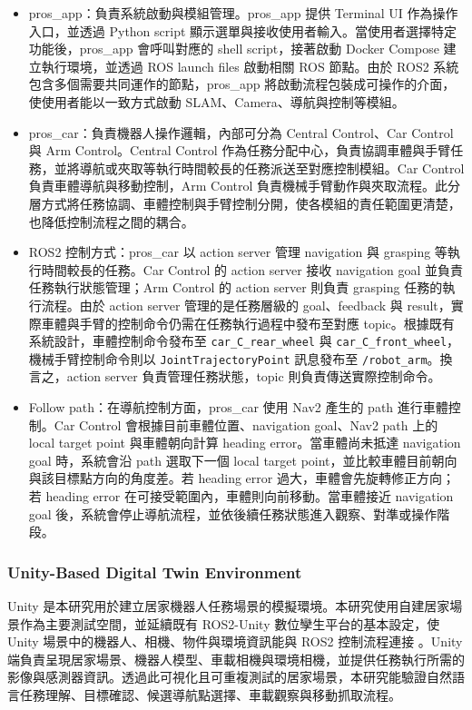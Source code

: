 \documentclass[12pt,a4paper]{article}
\begin{document}
\begin{itemize}
  \item pros\_app：負責系統啟動與模組管理。pros\_app 提供 Terminal UI 作為操作入口，並透過 Python script 顯示選單與接收使用者輸入。當使用者選擇特定功能後，pros\_app 會呼叫對應的 shell script，接著啟動 Docker Compose 建立執行環境，並透過 ROS launch files 啟動相關 ROS 節點。由於 ROS2 系統包含多個需要共同運作的節點，pros\_app 將啟動流程包裝成可操作的介面，使使用者能以一致方式啟動 SLAM、Camera、導航與控制等模組。
  \item pros\_car：負責機器人操作邏輯，內部可分為 Central Control、Car Control 與 Arm Control。Central Control 作為任務分配中心，負責協調車體與手臂任務，並將導航或夾取等執行時間較長的任務派送至對應控制模組。Car Control 負責車體導航與移動控制，Arm Control 負責機械手臂動作與夾取流程。此分層方式將任務協調、車體控制與手臂控制分開，使各模組的責任範圍更清楚，也降低控制流程之間的耦合。
  \item ROS2 控制方式：pros\_car 以 action server 管理 navigation 與 grasping 等執行時間較長的任務。Car Control 的 action server 接收 navigation goal 並負責任務執行狀態管理；Arm Control 的 action server 則負責 grasping 任務的執行流程。由於 action server 管理的是任務層級的 goal、feedback 與 result，實際車體與手臂的控制命令仍需在任務執行過程中發布至對應 topic。根據既有系統設計，車體控制命令發布至 \texttt{car\_C\_rear\_wheel} 與 \texttt{car\_C\_front\_wheel}，機械手臂控制命令則以 \texttt{JointTrajectoryPoint} 訊息發布至 \texttt{/robot\_arm}。換言之，action server 負責管理任務狀態，topic 則負責傳送實際控制命令。
  \item Follow path：在導航控制方面，pros\_car 使用 Nav2 產生的 path 進行車體控制。Car Control 會根據目前車體位置、navigation goal、Nav2 path 上的 local target point 與車體朝向計算 heading error。當車體尚未抵達 navigation goal 時，系統會沿 path 選取下一個 local target point，並比較車體目前朝向與該目標點方向的角度差。若 heading error 過大，車體會先旋轉修正方向；若 heading error 在可接受範圍內，車體則向前移動。當車體接近 navigation goal 後，系統會停止導航流程，並依後續任務狀態進入觀察、對準或操作階段。
\end{itemize}

\subsubsection{Unity-Based Digital Twin Environment}

Unity 是本研究用於建立居家機器人任務場景的模擬環境。本研究使用自建居家場景作為主要測試空間，並延續既有 ROS2-Unity 數位孿生平台的基本設定，使 Unity 場景中的機器人、相機、物件與環境資訊能與 ROS2 控制流程連接 \cite{yushiang2025}。Unity 端負責呈現居家場景、機器人模型、車載相機與環境相機，並提供任務執行所需的影像與感測器資訊。透過此可視化且可重複測試的居家場景，本研究能驗證自然語言任務理解、目標確認、候選導航點選擇、車載觀察與移動抓取流程。
\end{document}
